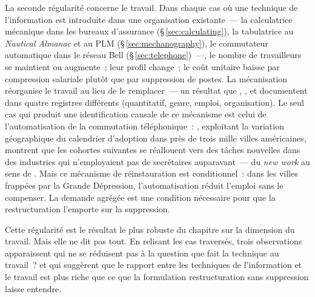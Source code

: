 La seconde régularité concerne le travail. Dans chaque cas où une technique de l'information est introduite dans une organisation existante~--- la calculatrice mécanique dans les bureaux d'assurance (§\,\ref{sec:calculating}), la tabulatrice au \emph{Nautical Almanac} et au PLM (§\,\ref{sec:mechanography}), le commutateur automatique dans le réseau Bell (§\,\ref{sec:telephone})~---, le nombre de travailleurs se maintient ou augmente~; leur profil change~; le coût unitaire baisse par compression salariale plutôt que par suppression de postes. La mécanisation réorganise le travail au lieu de le remplacer~--- un résultat que \textcite{reinstaller_market_2001}, \textcite{davies_womans_1982}, \textcite{feigenbaum_answering_2024} et \textcite{daston_calculation_2018} documentent dans quatre registres différents (quantitatif, genre, emploi, organisation). Le seul cas qui produit une identification causale de ce mécanisme est celui de l'automatisation de la commutation téléphonique~: \textcite{feigenbaum_answering_2024}, exploitant la variation géographique du calendrier d'adoption dans près de trois mille villes américaines, montrent que les cohortes suivantes se réallouent vers des tâches nouvelles dans des industries qui n'employaient pas de secrétaires auparavant~--- du \og \emph{new work}\fg{} au sens de \textcite{autor_new_2024}. Mais ce mécanisme de réinstauration est conditionnel~: dans les villes frappées par la Grande Dépression, l'automatisation réduit l'emploi sans le compenser. La demande agrégée est une condition nécessaire pour que la restructuration l'emporte sur la suppression.

Cette régularité est le résultat le plus robuste du chapitre sur la dimension du travail. Mais elle ne dit pas tout. En relisant les cas traversés, trois observations apparaissent qui ne se réduisent pas à la question \og que fait la technique au travail~?\fg{} et qui suggèrent que le rapport entre les techniques de l'information et le travail est plus riche que ce que la formulation \og restructuration sans suppression\fg{} laisse entendre.

